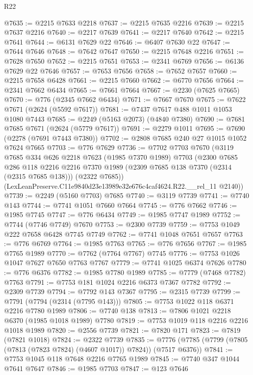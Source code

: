 \begin{lexlean}{R22}
\begin{coremodule}
@7635 := @2215 @7633 @2218
@7637 := @2215 @7635 @2216
@7639 := @2215 @7637 @2216
@7640 := @2217 @7639
@7641 := @2217 @7640
@7642 := @2215 @7641
@7644 := @6131 @7629 @22
@7646 := @6407 @7630 @22
@7647 := @7644 @7646
@7648 := @7642 @7647
@7650 := @2215 @7648 @2216
@7651 := @7628 @7650
@7652 := @2215 @7651
@7653 := @2341 @6769
@7656 := @6136 @7629 @22 @7646
@7657 := @7653 @7656
@7658 := @7652 @7657
@7660 := @2215 @7658 @6428
@7661 := @2215 @7660
@7662 := @6770 @7656
@7664 := @2341 @7662 @6434
@7665 := @7661 @7664
@7667 := @2230 (@7625 @7665)
@7670 := @776 (@2345 @7662 @6434)
@7671 := @7667 @7670
@7675 := @7622 @7671 (@2624 (@5592 @7617))
@7681 := @7437 @7617 @488 @1011 @1053 @1080 @7443
@7685 := @2249 (@5163 @2073) (@4840 @7380)
@7690 := @7681 @7685 @7671 (@2624 (@5779 @7617))
@7691 := @2279 @1011
@7695 := @7690 (@2278 (@7691 @7443 @7380))
@7702 := @2808 @7685 @240 @27 @1015 @1052 @7624 @7665
@7703 := @776 @7629
@7736 := @7702
    @7703
    @7670
    (@3119
      @7685
      @334
      @626
      @2218
      @7623
      (@1985 @7370 @1989)
      @7703
      (@2300
        @7685
        @286
        @118
        @2216
        @2216
        @7370
        @1989
        (@2309 @7685 @138 @7370 (@2314 (@2315 @7685 @138)))
        (@2322 @7685))
      (LexLeanPreserve.C11e9840d23e13989e32e676c4caf4624.R22.__rel_11 @2140))
@7739 := @2249 (@5160 @7703) @7685
@7740 := @3119 @7739
@7741 := @7740 @143
@7744 := @7741 @1051 @7660 @7664
@7745 := @776 @7662
@7746 := @1985 @7745
@7747 := @776 @6434
@7749 := @1985 @7747 @1989
@7752 := @7744 (@7746 @7749) @7670
@7753 := @2300 @7739
@7759 := @7753 @1049 @222 @7658 @6428 @7745 @7749
@7762 := @7741 @1048 @7651 @7657
@7763 := @776 @6769
@7764 := @1985 @7763
@7765 := @776 @7656
@7767 := @1985 @7765 @1989
@7770 := @7762 (@7764 @7767) @7745
@7776 := @7753 @1026 @1047 @7627 @7650 @7763 @7767
@7779 := @7741 @1025 @6374 @7626
@7780 := @776 @6376
@7782 := @1985 @7780 @1989
@7785 := @7779 (@7468 @7782) @7763
@7791 := @7753 @181 @1024 @2216 @6373 @7367 @7782
@7792 := @2309 @7739
@7794 := @7792 @143 @7367
@7795 := @2315 @7739
@7799 := @7791 (@7794 (@2314 (@7795 @143)))
@7805 := @7753 @1022 @118 @6371 @2216 @7780 @1989
@7806 := @7740 @138
@7813 := @7806 @1021 @2218 @6370 (@1985 @1018 @1989) @7780
@7819 := @7753 @1019 @118 @2216 @2216 @1018 @1989
@7820 := @2556 @7739
@7821 := @7820 @171
@7823 := @7819 (@7821 @1018)
@7824 := @2322 @7739
@7835 := @7776 (@7785 (@7799 (@7805 (@7813 (@7823 @7824) (@4607 @1017)) @7824)) (@7517 @6376))
@7841 := @7753 @1045 @118 @7648 @2216 @7765 @1989
@7845 := @7740 @347 @1044 @7641 @7647
@7846 := @1985 @7703
@7847 := @123 @7646

\end{coremodule}
\end{lexlean}
